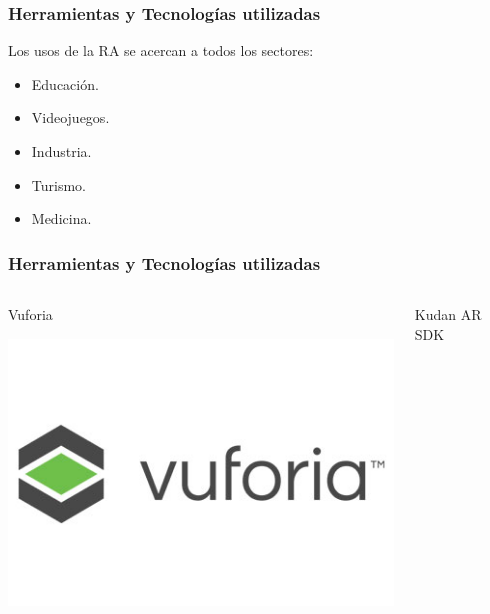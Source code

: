 \begin{frame}
	\frametitle{Herramientas y Tecnologías utilizadas}
		Los usos de la RA se acercan a todos los sectores:
		\begin{itemize}
			\item {Educación}.
			\item {Videojuegos.}
			\item {Industria.}
			\item {Turismo.}
			\item {Medicina.}
		\end{itemize}

	\endblock{}
\end{frame}



\begin{frame}
	\frametitle{Herramientas y Tecnologías utilizadas}
		\begin{columns}
			\begin{column}{0.3\textwidth}
				\begin{center}					
					Vuforia 
				\end{center}
				\vspace{3mm}
				\vfill 
					\begin{center}
						\includegraphics[width=0.8\linewidth]{Images/vuforia}
					\end{center}
			\end{column}
			\begin{column}{0.3\textwidth}
				\begin{center}
				Kudan AR SDK
				\end{center}
				\vspace{3mm}
				\vfill 
					\begin{center}

\end{center}
\end{column}
\end{columns}
\end{frame}
